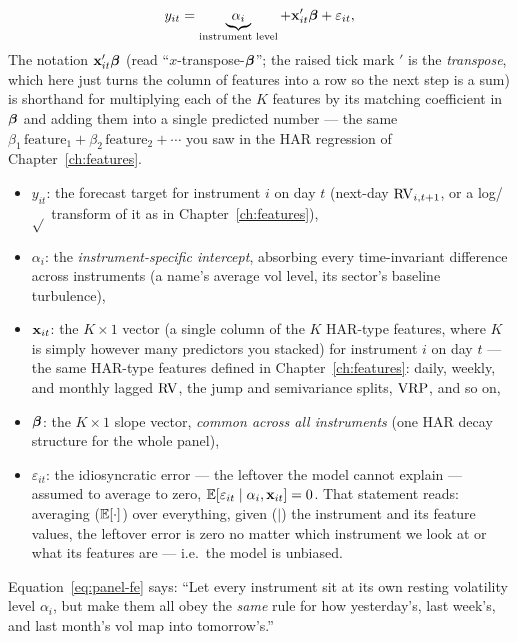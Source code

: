 \begin{equation}\label{eq:panel-fe}
  y_{it} = \underbrace{\alpha_i}_{\text{instrument level}}
           + \mathbf{x}_{it}'\bm{\beta} + \varepsilon_{it},
\end{equation}
The notation $\mathbf{x}_{it}'\bm{\beta}$ (read ``$x$-transpose-$\bm{\beta}$''; the raised tick
mark $'$ is the \emph{transpose}, which here just turns the column of features into
a row so the next step is a sum) is shorthand for multiplying each of the $K$
features by its matching coefficient in $\bm{\beta}$ and adding them into a single
predicted number --- the same $\beta_1\,\text{feature}_1 + \beta_2\,\text{feature}_2
+ \cdots$ you saw in the HAR regression of Chapter~\ref{ch:features}.
\begin{itemize}[nosep]
  \item $y_{it}$: the forecast target for instrument $i$ on day $t$ (next-day
        $\operatorname{RV}_{i,t+1}$, or a log/$\sqrt{}$ transform of it as in
        Chapter~\ref{ch:features}),
  \item $\alpha_i$: the \emph{instrument-specific intercept}, absorbing every
        time-invariant difference across instruments (a name's average vol level,
        its sector's baseline turbulence),
  \item $\mathbf{x}_{it}$: the $K\times1$ vector (a single column of the $K$ HAR-type
        features, where $K$ is simply however many predictors you stacked) for
        instrument $i$ on day $t$ --- the same HAR-type features defined in
        Chapter~\ref{ch:features}: daily, weekly, and monthly lagged $\operatorname{RV}$, the
        jump and semivariance splits, $\operatorname{VRP}$, and so on,
  \item $\bm{\beta}$: the $K\times1$ slope vector, \emph{common across all
        instruments} (one HAR decay structure for the whole panel),
  \item $\varepsilon_{it}$: the idiosyncratic error --- the leftover the model
        cannot explain --- assumed to average to zero,
        $\mathbb{E}[\varepsilon_{it}\mid\alpha_i,\mathbf{x}_{it}] = 0$.  That statement reads:
        averaging ($\mathbb{E}[\cdot]$) over everything, given ($\mid$) the instrument and
        its feature values, the leftover error is zero no matter which instrument
        we look at or what its features are --- i.e.\ the model is unbiased.
\end{itemize}

\begin{intuition}
Equation~\eqref{eq:panel-fe} says: ``Let every instrument sit at its own resting
volatility level $\alpha_i$, but make them all obey the \emph{same} rule for how
yesterday's, last week's, and last month's vol map into tomorrow's.''
\end{intuition}


